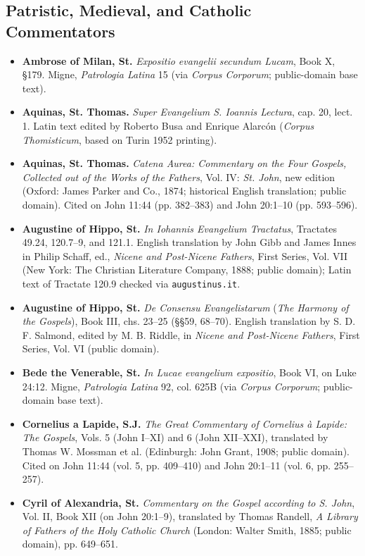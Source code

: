 \subsection{Patristic, Medieval, and Catholic Commentators}

\begin{itemize}
\item \textbf{Ambrose of Milan, St.} \emph{Expositio evangelii secundum Lucam}, Book X, \S 179. Migne, \emph{Patrologia Latina} 15 (via \emph{Corpus Corporum}; public-domain base text).
\item \textbf{Aquinas, St. Thomas.} \emph{Super Evangelium S. Ioannis Lectura}, cap. 20, lect. 1. Latin text edited by Roberto Busa and Enrique Alarc\'on (\emph{Corpus Thomisticum}, based on Turin 1952 printing).
\item \textbf{Aquinas, St. Thomas.} \emph{Catena Aurea: Commentary on the Four Gospels, Collected out of the Works of the Fathers}, Vol. IV: \emph{St. John}, new edition (Oxford: James Parker and Co., 1874; historical English translation; public domain). Cited on John 11:44 (pp. 382--383) and John 20:1--10 (pp. 593--596).
\item \textbf{Augustine of Hippo, St.} \emph{In Iohannis Evangelium Tractatus}, Tractates 49.24, 120.7--9, and 121.1. English translation by John Gibb and James Innes in Philip Schaff, ed., \emph{Nicene and Post-Nicene Fathers}, First Series, Vol. VII (New York: The Christian Literature Company, 1888; public domain); Latin text of Tractate 120.9 checked via \texttt{augustinus.it}.
\item \textbf{Augustine of Hippo, St.} \emph{De Consensu Evangelistarum} (\emph{The Harmony of the Gospels}), Book III, chs. 23--25 (\S\S 59, 68--70). English translation by S. D. F. Salmond, edited by M. B. Riddle, in \emph{Nicene and Post-Nicene Fathers}, First Series, Vol. VI (public domain).
\item \textbf{Bede the Venerable, St.} \emph{In Lucae evangelium expositio}, Book VI, on Luke 24:12. Migne, \emph{Patrologia Latina} 92, col. 625B (via \emph{Corpus Corporum}; public-domain base text).
\item \textbf{Cornelius a Lapide, S.J.} \emph{The Great Commentary of Cornelius \`a Lapide: The Gospels}, Vols. 5 (John I--XI) and 6 (John XII--XXI), translated by Thomas W. Mossman et al. (Edinburgh: John Grant, 1908; public domain). Cited on John 11:44 (vol. 5, pp. 409--410) and John 20:1--11 (vol. 6, pp. 255--257).
\item \textbf{Cyril of Alexandria, St.} \emph{Commentary on the Gospel according to S. John}, Vol. II, Book XII (on John 20:1--9), translated by Thomas Randell, \emph{A Library of Fathers of the Holy Catholic Church} (London: Walter Smith, 1885; public domain), pp. 649--651.

\end{itemize}
